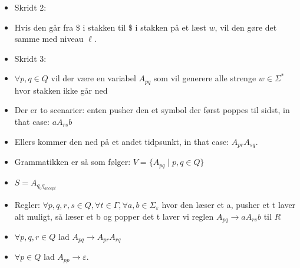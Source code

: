 \begin{itemize}
\begin{itemize}
		      \item Skridt 2:
		      \item Hvis den går fra $\mathdollar$ i stakken til $\mathdollar$ i stakken på et læst $w$, vil den gøre det samme med niveau $\ell$.
		      \item Skridt 3:
		      \item \(\forall p, q \in Q\) vil der være en variabel $A_{pq}$ som vil generere alle strenge $w \in \Sigma^{*}$ hvor stakken ikke går ned
		      \item Der er to scenarier: enten pusher den et symbol der først poppes til sidst, in that case: $aA_{rs}b$
		      \item Ellers kommer den ned på et andet tidpsunkt, in that case: $A_{pr}A_{sq}$.
		      \item Grammatikken er så som følger: $V = \{A_{pq} \mid p, q \in Q\}$
		      \item $S = A_{q_{0}q_{accept}}$
		      \item Regler: $\forall p, q, r, s \in Q, \forall t \in \Gamma, \forall a, b \in \Sigma_{\varepsilon}$ hvor den læser et a, pusher et t laver alt muligt, så læser et b og popper det t laver vi reglen $A_{pq} \rightarrow aA_{rs}b$ til $R$
		      \item $\forall p,q,r \in Q$ lad $A_{pq} \rightarrow A_{pr}A_{rq}$
		      \item $\forall p \in Q $ lad $A_{pp} \rightarrow \varepsilon$.
	      \end{itemize}
\end{itemize}

